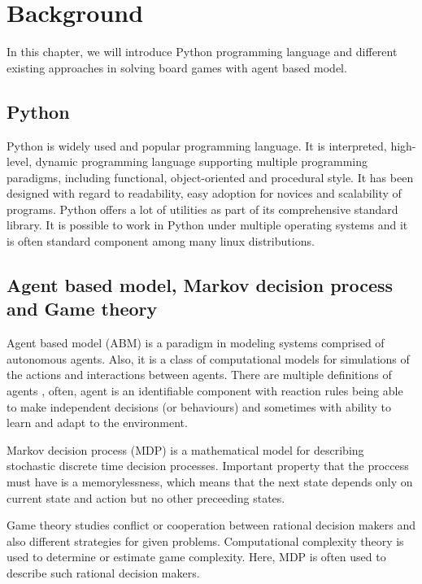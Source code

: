 \chapter{Background}\label{chap:2}
  In this chapter, we will introduce Python programming language and
different existing approaches in solving board games with agent based model.

\section{Python}
Python is widely used and popular
programming language. It is interpreted, high-level, dynamic programming
language supporting multiple programming paradigms, including functional,
object-oriented and procedural style. It has been designed with regard to
readability, easy adoption for novices and scalability of programs. Python
offers a lot of utilities as part of its comprehensive standard library. It is
possible to work in Python under multiple operating systems and it is often
standard component among many linux distributions.

\section{Agent based model, Markov decision process and Game theory}
Agent based model (ABM) is a paradigm in modeling systems comprised
of autonomous agents. Also, it is a class of computational models for
simulations of the actions and interactions between agents. There
are multiple definitions of agents \cite{abm}, often, agent
is an identifiable component with reaction rules being able to make independent
decisions (or behaviours) and sometimes with ability to learn and adapt to
the environment.

Markov decision process (MDP) is a mathematical model for describing stochastic
discrete time decision processes. Important property that the proccess must
have is a memorylessness, which means that the next state depends only
on current state and action but no other preceeding states.

Game theory studies conflict or cooperation between rational decision makers
and also different strategies for given problems. Computational
complexity theory is used to determine or estimate game complexity. Here, MDP
is often used to describe such rational decision makers.

